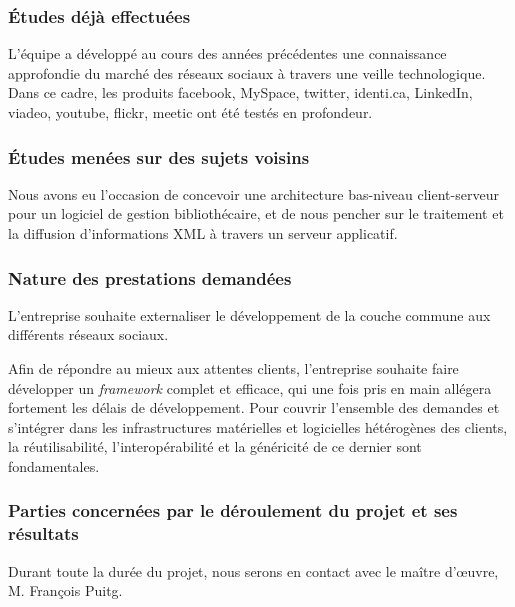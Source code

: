 \subsubsection{Études déjà effectuées}

L'équipe a développé au cours des années précédentes une connaissance approfondie du marché des réseaux sociaux à travers une veille technologique. Dans ce cadre, les produits facebook, MySpace, twitter, identi.ca, LinkedIn, viadeo, youtube, flickr, meetic ont été testés en profondeur.

\subsubsection{Études menées sur des sujets voisins}

Nous avons eu l'occasion de concevoir une architecture bas-niveau client-serveur pour un logiciel de gestion bibliothécaire, et de nous pencher sur le traitement et la diffusion d'informations XML à travers un serveur applicatif.


\subsubsection{Nature des prestations demandées}

L'entreprise souhaite externaliser le développement de la couche commune aux différents réseaux sociaux.

Afin de répondre au mieux aux attentes clients, l'entreprise souhaite faire développer un \emph{framework} complet et efficace, qui une fois pris en main allégera fortement les délais de développement. Pour couvrir l'ensemble des demandes et s'intégrer dans les infrastructures matérielles et logicielles hétérogènes des clients, la réutilisabilité, l'interopérabilité et la généricité de ce dernier sont fondamentales.

\subsubsection{Parties concernées par le déroulement du projet et ses résultats}

Durant toute la durée du projet, nous serons en contact avec le maître d'œuvre, M. François Puitg.

